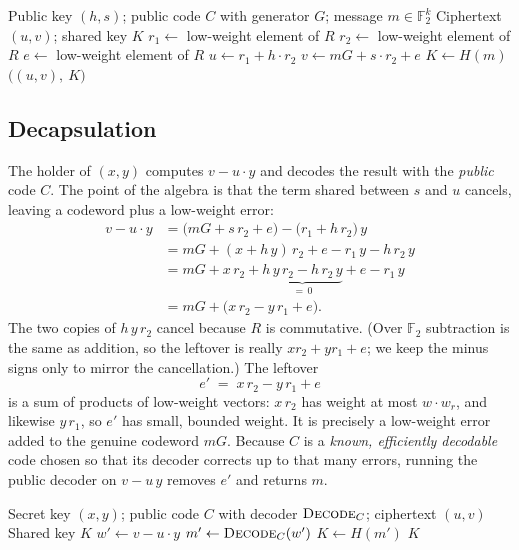 \begin{algorithm}[H]
\caption{HQC Encapsulate (teaching form)}
\label{alg:hqc-encaps}
\begin{algorithmic}[1]
\Require Public key $(h,s)$; public code $C$ with generator $G$; message $m\in\mathbb{F}_2^{k}$
\Ensure Ciphertext $(u,v)$; shared key $K$
\State $r_1 \gets$ low-weight element of $R$ 
\State $r_2 \gets$ low-weight element of $R$ 
\State $e \gets$ low-weight element of $R$ 
\State $u \gets r_1 + h\cdot r_2$
\State $v \gets mG + s\cdot r_2 + e$ 
\State $K \gets H(m)$ 
\State \Return $\big((u,v),\ K\big)$
\end{algorithmic}
\end{algorithm}

\subsection{Decapsulation}

The holder of $(x, y)$ computes $v - u\cdot y$ and decodes the result with the \emph{public} code $C$. The point of the algebra is that the term shared between $s$ and $u$ cancels, leaving a codeword plus a low-weight error:
\[
\begin{aligned}
v - u\cdot y
  &= \big(mG + s\,r_2 + e\big) - \big(r_1 + h\,r_2\big)\,y \\[2pt]
  &= mG + (x + h\,y)\,r_2 + e - r_1\,y - h\,r_2\,y \\[2pt]
  &= mG + x\,r_2 + \underbrace{h\,y\,r_2 - h\,r_2\,y}_{=\,0} + e - r_1\,y \\[2pt]
  &= mG + \big(x\,r_2 - y\,r_1 + e\big).
\end{aligned}
\]
The two copies of $h\,y\,r_2$ cancel because $R$ is commutative. (Over $\mathbb{F}_2$ subtraction is the same as addition, so the leftover is really $x r_2 + y r_1 + e$; we keep the minus signs only to mirror the cancellation.) The leftover
\[
e' \;=\; x\,r_2 - y\,r_1 + e
\]
is a sum of products of low-weight vectors: $x\,r_2$ has weight at most $w\cdot w_r$, and likewise $y\,r_1$, so $e'$ has small, bounded weight. It is precisely a low-weight error added to the genuine codeword $mG$. Because $C$ is a \emph{known, efficiently decodable} code chosen so that its decoder corrects up to that many errors, running the public decoder on $v - u\,y$ removes $e'$ and returns $m$.

\begin{algorithm}[H]
\caption{HQC Decapsulate (teaching form)}
\label{alg:hqc-decaps}
\begin{algorithmic}[1]
\Require Secret key $(x,y)$; public code $C$ with decoder $\textsc{Decode}_C$; ciphertext $(u,v)$
\Ensure Shared key $K$
\State $w' \gets v - u\cdot y$ 
\State $m' \gets \textsc{Decode}_C(w')$ 
\State $K \gets H(m')$
\State \Return $K$
\end{algorithmic}
\end{algorithm}


